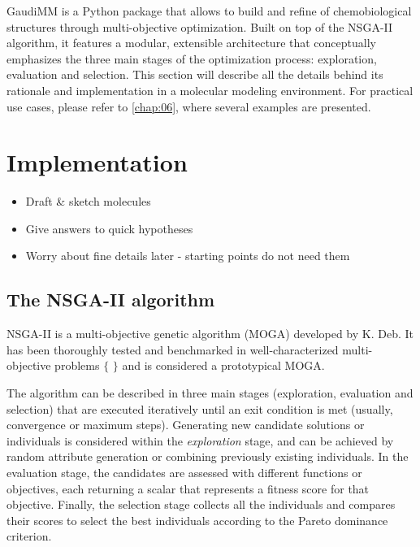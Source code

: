 


GaudiMM is a Python package that allows to build and refine of chemobiological structures through multi-objective optimization. Built on top of the NSGA-II algorithm, it features a modular, extensible architecture that conceptually emphasizes the three main stages of the optimization process: exploration, evaluation and selection. This section will describe all the details behind its rationale and implementation in a molecular modeling environment. For practical use cases, please refer to \autoref{chap:06}, where several examples are presented.

\section{Implementation}


\begin{itemize}
	\item Draft \& sketch molecules
	\item Give answers to quick hypotheses
	\item Worry about fine details later - starting points do not need them
\end{itemize}

\subsection{The NSGA-II algorithm}
NSGA-II is a multi-objective genetic algorithm (MOGA) developed by K. Deb. It has been thoroughly tested and benchmarked in well-characterized multi-objective problems $ \{ $ $ \} $  and is considered a prototypical MOGA.

The algorithm can be described in three main stages (exploration, evaluation and selection) that are executed iteratively until an exit condition is met (usually, convergence or maximum steps). Generating new candidate solutions or individuals is considered within the \textit{exploration} stage, and can be achieved by random attribute generation or combining previously existing individuals. In the evaluation stage, the candidates are assessed with different functions or objectives, each returning a scalar that represents a fitness score for that objective. Finally, the selection stage collects all the individuals and compares their scores to select the best individuals according to the Pareto dominance criterion.

